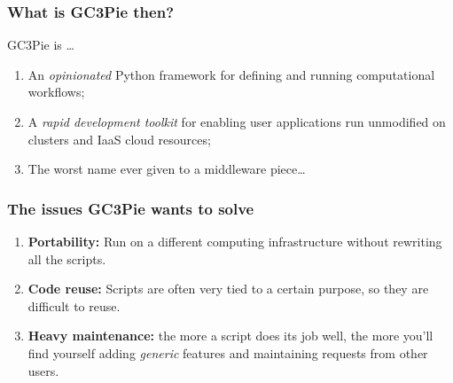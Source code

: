 \documentclass[english,serif,mathserif,xcolor=pdftex,dvipsnames,table]{beamer}
\begin{document}





\begin{frame}
  \frametitle{What is GC3Pie then?}
  GC3Pie is \ldots
  \begin{enumerate}
  \item<1-> \alert<1>{An \emph{opinionated} Python framework for defining and running computational workflows;}
  \item<2-> \alert<2>{A \emph{rapid development toolkit} for enabling user applications run unmodified on clusters and IaaS cloud resources;}
  \item<3-> \alert<3>{The worst name ever given to a middleware piece\ldots}
  \end{enumerate}
\end{frame}


\begin{frame}
  \frametitle{The issues GC3Pie wants to solve}
  \begin{enumerate}
  \item \textbf{Portability:} Run on a different computing
    infrastructure without rewriting all the scripts.
  \item \textbf{Code reuse:} Scripts are often very tied to a certain
    purpose, so they are difficult to reuse.
  \item \textbf{Heavy maintenance:} the more a script does its job
    well, the more you'll find yourself adding \emph{generic} features
    and maintaining requests from other users.
  \end{enumerate}
\end{frame}
\end{document}
